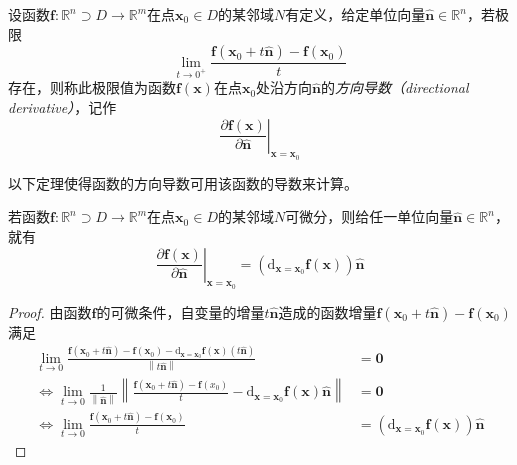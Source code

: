 \documentclass[main.tex]{subfiles}
\begin{document}
\begin{definition}[方向导数]\label{def:II.4.18}
    设函数$\mathbf{f}:\mathbb{R}^n\supset D\rightarrow\mathbb{R}^m$在点$\mathbf{x}_0\in D$的某邻域$N$有定义，给定单位向量$\mathbf{\hat{n}}\in\mathbb{R}^n$，若极限
    \[\lim_{t\to 0^+}\frac{\mathbf{f}\left(\mathbf{x}_0+t\mathbf{\hat{n}}\right)-\mathbf{f}\left(\mathbf{x}_0\right)}{t}\]
    存在，则称此极限值为函数$\mathbf{f}\left(\mathbf{x}\right)$在点$\mathbf{x}_0$处沿方向$\mathbf{\hat{n}}$的\emph{方向导数（directional derivative）}，记作
    \[\left.\frac{\partial\mathbf{f}\left(\mathbf{x}\right)}{\partial\mathbf{\hat{n}}}\right|_{\mathbf{x}=\mathbf{x}_0}\]
\end{definition}

以下定理使得函数的方向导数可用该函数的导数来计算。

\begin{theorem}\label{thm:II.4.10}
    若函数$\mathbf{f}:\mathbb{R}^n\supset D\rightarrow\mathbb{R}^m$在点$\mathbf{x}_0\in D$的某邻域$N$可微分，则给任一单位向量$\mathbf{\hat{n}}\in\mathbb{R}^n$，就有
    \[\left.\frac{\partial\mathbf{f}\left(\mathbf{x}\right)}{\partial\mathbf{\hat{n}}}\right|_{\mathbf{x}=\mathbf{x}_0}=\left(\mathrm{d}_{\mathbf{x}=\mathbf{x}_0}\mathbf{f}\left(\mathbf{x}\right)\right)\mathbf{\hat{n}}\]
\end{theorem}
\begin{proof}
    由函数$\mathbf{f}$的可微条件，自变量的增量$t\mathbf{\hat{n}}$造成的函数增量$\mathbf{f}\left(\mathbf{x}_0+t\mathbf{\hat{n}}\right)-\mathbf{f}\left(\mathbf{x}_0\right)$满足
    \begin{align*}
        \lim_{t\to 0}\frac{\mathbf{f}\left(\mathbf{x}_0+t\mathbf{\hat{n}}\right)-\mathbf{f}\left(\mathbf{x}_0\right)-\mathrm{d}_{\mathbf{x}=\mathbf{x}_0}\mathbf{f}\left(\mathbf{x}\right)\left(t\mathbf{\hat{n}}\right)}{\left\|t\mathbf{\hat{n}}\right\|}                  & =\mathbf{0}                                                                                         \\
        \Leftrightarrow\lim_{t\to 0}\frac{1}{\left\|\mathbf{\hat{n}}\right\|}\left\|\frac{\mathbf{f}\left(\mathbf{x}_0+t\mathbf{\hat{n}}\right)-\mathbf{f}\left(x_0\right)}{t}-\mathrm{d}_{\mathbf{x}=\mathbf{x}_0}\mathbf{f}\left(\mathbf{x}\right)\mathbf{\hat{n}}\right\| & =\mathbf{0}                                                                                         \\
        \Leftrightarrow\lim_{t\to 0}\frac{\mathbf{f}\left(\mathbf{x}_0+t\mathbf{\hat{n}}\right)-\mathbf{f}\left(\mathbf{x}_0\right)}{t}                                                                                                                                      & =\left(\mathrm{d}_{\mathbf{x}=\mathbf{x}_0}\mathbf{f}\left(\mathbf{x}\right)\right)\mathbf{\hat{n}}
    \end{align*}
\end{proof}
\end{document}
